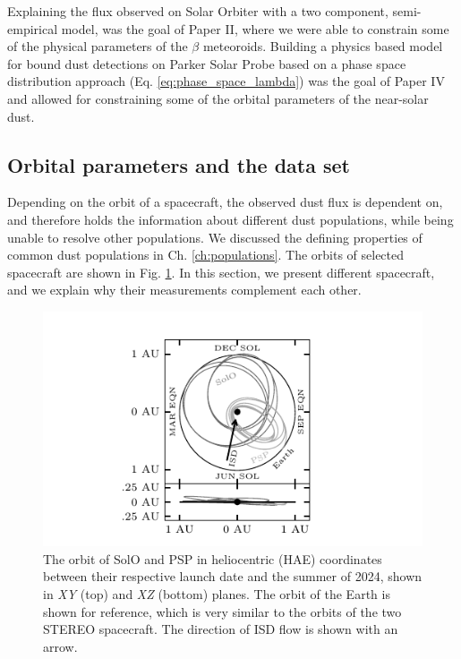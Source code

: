 Explaining the flux observed on Solar Orbiter with a two component, semi-empirical model, was the goal of Paper II, where we were able to constrain some of the physical parameters of the $\beta$ meteoroids. Building a physics based model for bound dust detections on Parker Solar Probe based on a phase space distribution approach (Eq. \ref{eq:phase_space_lambda}) was the goal of Paper IV and allowed for constraining some of the orbital parameters of the near-solar dust. 

\subsection{Orbital parameters and the data set}

Depending on the orbit of a spacecraft, the observed dust flux is dependent on, and therefore holds the information about different dust populations, while being unable to resolve other populations. We discussed the defining properties of common dust populations in Ch. \ref{ch:populations}. The orbits of selected spacecraft are shown in Fig. \ref{fig:sc_orbits}. In this section, we present different spacecraft, and we explain why their measurements complement each other.  

\begin{figure}[h]
 	\centering
 	\includegraphics[width=13cm]{figures/solo_orbit.pdf}
 	\caption{The orbit of SolO and PSP in heliocentric (HAE) coordinates between their respective launch date and the summer of 2024, shown in \textit{XY} (top) and \textit{XZ} (bottom) planes. The orbit of the Earth is shown for reference, which is very similar to the orbits of the two STEREO spacecraft. The direction of ISD flow is shown with an arrow.}
 	\label{fig:sc_orbits}
\end{figure}

